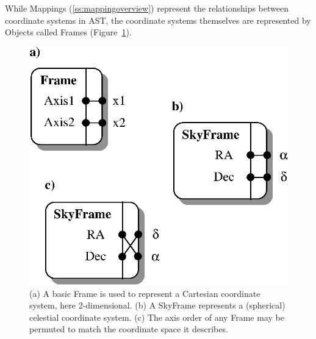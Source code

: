 \documentclass[twoside,11pt]{article}
\newenvironment{latexonly}{}{}
\newcommand{\htmlref}[2]{#1}
\newcommand{\secref}[1]{\S\ref{#1}}
\renewcommand{\secref}[1]{\ref{#1}}
\begin{document}
\begin{latexonly}
   While Mappings (\secref{ss:mappingoverview}) represent the
   relationships between coordinate systems in AST, the coordinate
   systems themselves are represented by Objects called Frames
   (Figure~\ref{fig:frames}).
   \begin{figure}
   \begin{center}
   \includegraphics[scale=0.75]{sun210_figures/frames.eps}
   \caption{(a) A basic \htmlref{Frame}{Frame} is used to represent a Cartesian coordinate
   system, here 2-dimensional. (b) A \htmlref{SkyFrame}{SkyFrame} represents a (spherical)
   celestial coordinate system. (c) The axis order of any Frame may be
   permuted to match the coordinate space it describes.}
   \label{fig:frames}
   \end{center}
   \end{figure}
\end{latexonly}
\end{document}
